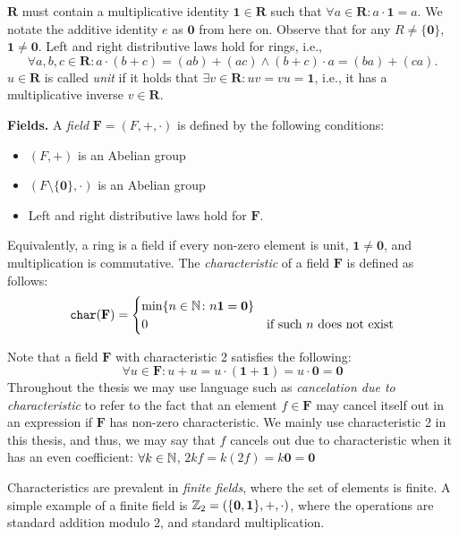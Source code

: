 $\mathbf{R}$ must contain a multiplicative identity 
$\mathbf{1} \in \mathbf{R}$ such that $\forall a \in \mathbf{R} \colon a \cdot \mathbf{1} = a$. 
We notate the additive identity $e$ 
as $\mathbf{0}$ from here on. 
Observe that for any $R \neq \{\mathbf{0}\}$, $\mathbf{1} \neq \mathbf{0}$. 
Left and right distributive laws hold for rings, i.e., 
\[
  \forall a, b, c \in \mathbf{R} \colon a \cdot (b + c) = (ab) + (ac) \land (b + c) \cdot a = (ba) + (ca).
\]
$u \in \mathbf{R}$ is called \emph{unit} if it holds 
that $\exists v \in \mathbf{R} \colon uv = vu = \mathbf{1}$, 
i.e., it has a multiplicative inverse $v \in \mathbf{R}$.

\textbf{Fields.} A \emph{field} $\mathbf{F} = (F, +, \cdot)$ is defined by the following conditions:
\begin{itemize}
  \item $(F, +)$ is an Abelian group
  \item $(F\setminus \{\mathbf{0}\}, \cdot )$ is an Abelian group
  \item Left and right distributive laws hold for $\mathbf{F}$.
\end{itemize}

Equivalently, a ring is a field if every non-zero element is unit, $\mathbf{1} \neq \mathbf{0}$, 
and multiplication is commutative. 
The \emph{characteristic} of a field $\mathbf{F}$ is defined as follows:
\begin{equation}
  \texttt{char}(\mathbf{F}) =
    \begin{cases}
      \min\{n \in \mathbb N \colon n\mathbf{1} = \mathbf{0} \}\\
      0 & \text{if such $n$ does not exist}\\
    \end{cases}       
\end{equation}

Note that a field $\mathbf{F}$ with 
characteristic 2 satisfies the following:
\[
  \forall u \in \mathbf{F} \colon u + u = u \cdot (\mathbf 1 + \mathbf 1) = u \cdot \mathbf 0 = \mathbf 0
\]
Throughout the thesis we may use language such as \emph{cancelation due to characteristic} to 
refer to the fact that an element $f \in \mathbf{F}$ may cancel itself out in an expression if 
$\mathbf{F}$ has non-zero characteristic. 
We mainly use characteristic 2 in this thesis, and thus, we may say that 
$f$ cancels out due to characteristic when 
it has an even coefficient: $\forall k \in \mathbb N$, $2kf = k(2f) = k\mathbf{0}=\mathbf{0}$

Characteristics are prevalent in \emph{finite fields}, where the set of elements is finite. 
A simple example of a finite field is $\mathbb Z_2 = (\{\mathbf{0}, \mathbf{1}\}, +, \cdot)$, where 
the operations are standard addition modulo 2, and standard multiplication. 

